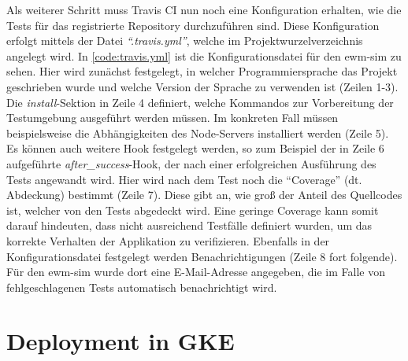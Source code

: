 Als weiterer Schritt muss Travis CI nun noch eine Konfiguration erhalten, wie die Tests für das registrierte Repository durchzuführen sind.
Diese Konfiguration erfolgt mittels der Datei \emph{\enquote{.travis.yml}}, welche im Projektwurzelverzeichnis angelegt wird.
In \autoref{code:travis.yml} ist die Konfigurationsdatei für den \ac{ewm-sim} zu sehen.
Hier wird zunächst festgelegt, in welcher Programmiersprache das Projekt geschrieben wurde und welche Version der Sprache zu verwenden ist (Zeilen 1-3).
Die \emph{install}-Sektion in Zeile 4 definiert, welche Kommandos zur Vorbereitung der Testumgebung ausgeführt werden müssen.
Im konkreten Fall müssen beispielsweise die Abhängigkeiten des Node-Servers installiert werden (Zeile 5).
Es können auch weitere Hook festgelegt werden, so zum Beispiel der in Zeile 6 aufgeführte \emph{after\_success}-Hook, der nach einer erfolgreichen Ausführung des Tests angewandt wird.
Hier wird nach dem Test noch die \enquote{Coverage} (dt. Abdeckung) bestimmt (Zeile 7).
Diese gibt an, wie groß der Anteil des Quellcodes ist, welcher von den Tests abgedeckt wird.
Eine geringe Coverage kann somit darauf hindeuten, dass nicht ausreichend Testfälle definiert wurden, um das korrekte Verhalten der Applikation zu verifizieren.
Ebenfalls in der Konfigurationsdatei festgelegt werden Benachrichtigungen (Zeile 8 fort folgende).
Für den \ac{ewm-sim} wurde dort eine E-Mail-Adresse angegeben, die im Falle von fehlgeschlagenen Tests automatisch benachrichtigt wird.




\section{Deployment in \ac{GKE}}
